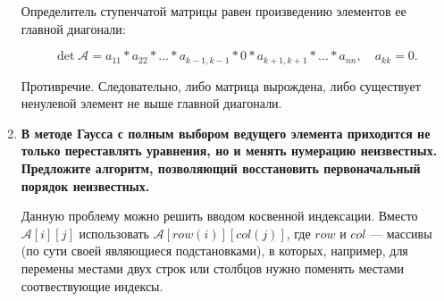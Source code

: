\documentclass[12pt, a4paper]{article}
\begin{document}
\begin{enumerate}
Определитель ступенчатой матрицы равен произведению элементов ее главной диагонали:

\[
\det \mathcal{A} = a_{11} * a_{22} * ... * a_{k-1, k-1} * 0 * a_{k+1, k+1} * ... * a_{nn}, \quad a_{kk} = 0.
\]

Противречие. Следовательно, либо матрица вырождена, либо существует ненулевой элемент не выше главной диагонали. 

\item{\bf В методе Гаусса с полным выбором ведущего элемента
приходится не только переставлять уравнения, но и менять нумерацию неизвестных. Предложите алгоритм, позволяющий восстановить первоначальный порядок неизвестных.}

Данную проблему можно решить вводом косвенной индексации. Вместо $\mathcal{A}[i][j]$ использовать $\mathcal{A}[row(i)][col(j)]$, где $row$ и $col$ --- массивы (по сути своей являющиеся подстановками), в которых, например, для перемены местами двух строк или столбцов нужно поменять местами соотвествующие индексы.
\end{enumerate}
\newpage
\end{document}
